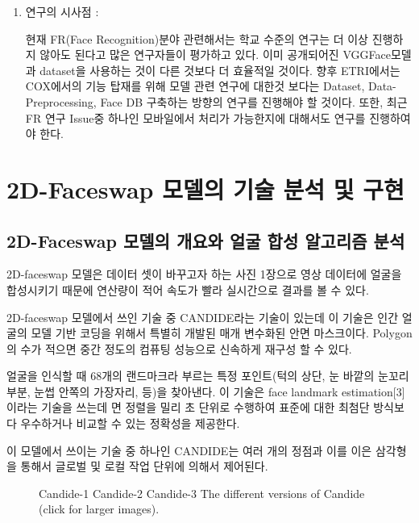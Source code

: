 \documentclass{oblivoir}
\begin{document}
\begin{enumerate}
    \item 연구의 시사점 : 

    현재 FR(Face Recognition)분야 관련해서는 학교 수준의 연구는 더 이상 진행하지 않아도 된다고 많은 연구자들이 평가하고 있다. 이미 공개되어진 VGGFace모델과 dataset을 사용하는 것이 다른 것보다 더 효율적일 것이다. 향후 ETRI에서는 COX에서의 기능 탑재를 위해 모델 관련 연구에 대한것 보다는 Dataset, Data-Preprocessing, Face DB 구축하는 방향의 연구를 진행해야 할 것이다. 또한, 최근 FR 연구 Issue중 하나인 모바일에서 처리가 가능한지에 대해서도 연구를 진행하여야 한다.
        
\end{enumerate}

\chapter{ 2D-Faceswap 모델의 기술 분석 및 구현 }

\section{2D-Faceswap 모델의 개요와 얼굴 합성 알고리즘 분석}

2D-faceswap 모델은 데이터 셋이 바꾸고자 하는 사진 1장으로 영상 데이터에 얼굴을 합성시키기 때문에 연산량이 적어 속도가 빨라 실시간으로 결과를 볼 수 있다. 

2D-faceswap 모델에서 쓰인 기술 중 CANDIDE라는 기술이 있는데 이 기술은 인간 얼굴의 모델 기반 코딩을 위해서 특별히 개발된 매개 변수화된 안면 마스크이다. Polygon의 수가 적으면 중간 정도의 컴퓨팅 성능으로 신속하게 재구성 할 수 있다.

얼굴을 인식할 때 68개의 랜드마크라 부르는 특정 포인트(턱의 상단, 눈 바깥의 눈꼬리부분, 눈썹 안쪽의 가장자리, 등)을 찾아낸다. 이 기술은 face landmark estimation[3]이라는 기술을 쓰는데 면 정렬을 밀리 초 단위로 수행하여 표준에 대한 최첨단 방식보다 우수하거나 비교할 수 있는 정확성을 제공한다. 

\begin{figure}[h!]
\centering
\caption{\cite{reference7}}
\end{figure}



이 모델에서 쓰이는 기술 중 하나인 CANDIDE는 여러 개의 정점과 이를 이은 삼각형을 통해서 글로벌 및 로컬 작업 단위에 의해서 제어된다.



\begin{figure}[h!]
\centering
\caption{ 
Candide-1
Candide-2
Candide-3
The different versions of Candide (click for larger images).}
\end{figure}
\end{document}
